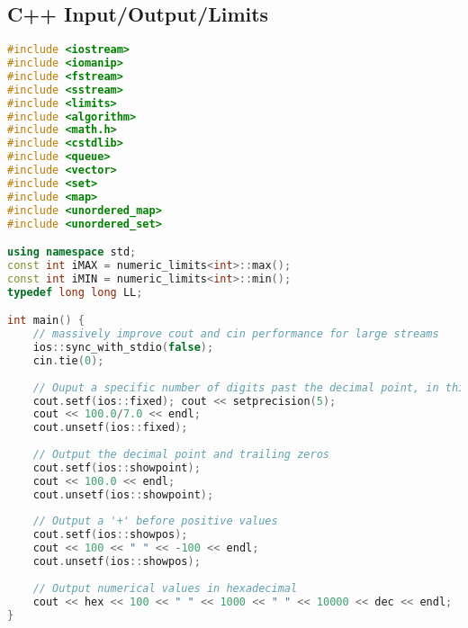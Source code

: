 \subsection{C++ Input/Output/Limits}
\begin{lstlisting}[language=C++]
#include <iostream>
#include <iomanip>
#include <fstream>
#include <sstream>
#include <limits>
#include <algorithm>
#include <math.h>
#include <cstdlib>
#include <queue>
#include <vector>
#include <set>
#include <map>
#include <unordered_map>
#include <unordered_set>

using namespace std;
const int iMAX = numeric_limits<int>::max();
const int iMIN = numeric_limits<int>::min();
typedef long long LL;

int main() {
	// massively improve cout and cin performance for large streams
	ios::sync_with_stdio(false);
	cin.tie(0);
	
	// Ouput a specific number of digits past the decimal point, in this case 5    
	cout.setf(ios::fixed); cout << setprecision(5);
	cout << 100.0/7.0 << endl;
	cout.unsetf(ios::fixed);
    
	// Output the decimal point and trailing zeros
	cout.setf(ios::showpoint);
	cout << 100.0 << endl;
	cout.unsetf(ios::showpoint);
    
	// Output a '+' before positive values
	cout.setf(ios::showpos);
	cout << 100 << " " << -100 << endl;
	cout.unsetf(ios::showpos);
    
	// Output numerical values in hexadecimal
	cout << hex << 100 << " " << 1000 << " " << 10000 << dec << endl;
}
\end{lstlisting}